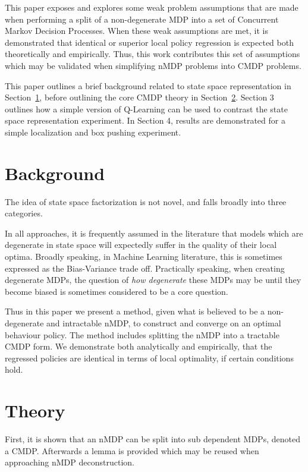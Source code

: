 \documentclass[compsoc,journal,letterpaper,10pt,draftcls,twocolumn]{IEEEtran}
\begin{document}
This paper exposes and explores some weak problem assumptions that are
made when performing a split of a non-degenerate MDP into a set of
Concurrent Markov Decision Processes. When these weak assumptions are
met, it is demonstrated that identical or superior local policy
regression is expected both theoretically and empirically. Thus, this
work contributes this set of assumptions which may be validated when
simplifying nMDP problems into CMDP problems.

This paper outlines a brief background related to state space
representation in Section~\ref{sec:background}, before outlining the core CMDP theory in
Section~\ref{sec:theory}. Section 3 outlines how a simple version of Q-Learning can be
used to contrast the state space representation experiment. In Section
4, results are demonstrated for a simple localization and box pushing
experiment.

\section{Background}\label{sec:background}

The idea of state space factorization is not novel, and falls broadly
into three categories.

In all approaches, it is frequently assumed in the literature that
models which are degenerate in state space will expectedly suffer in the
quality of their local optima. Broadly speaking, in Machine Learning
literature, this is sometimes expressed as the Bias-Variance trade off.
Practically speaking, when creating degenerate MDPs, the question of
\emph{how degenerate} these MDPs may be until they become biased is
sometimes considered to be a core question.

Thus in this paper we present a method, given what is believed to be a
non-degenerate and intractable nMDP, to construct and converge on an
optimal behaviour policy. The method includes splitting the nMDP into a
tractable CMDP form. We demonstrate both analytically and empirically,
that the regressed policies are identical in terms of local optimality,
if certain conditions hold.

\section{Theory}\label{sec:theory}

First, it is shown that an nMDP can be split into sub dependent MDPs,
denoted a CMDP. Afterwards a lemma is provided which may be reused when
approaching nMDP deconstruction.
\end{document}
